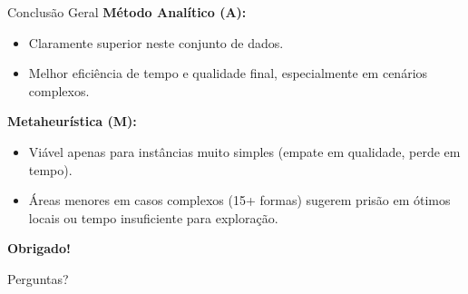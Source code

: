 \documentclass{beamer}
\begin{document}
\begin{frame}{Conclusão Geral}
    \textbf{Método Analítico (A):}
    \begin{itemize}
        \item Claramente superior neste conjunto de dados.
        \item Melhor eficiência de tempo e qualidade final, especialmente em cenários complexos.
    \end{itemize}

    \vspace{0.5cm}
    \textbf{Metaheurística (M):}
    \begin{itemize}
        \item Viável apenas para instâncias muito simples (empate em qualidade, perde em tempo).
        \item Áreas menores em casos complexos (15+ formas) sugerem prisão em ótimos locais ou tempo insuficiente para exploração.
    \end{itemize}
\end{frame}

\begin{frame}
    \centering
    \Huge \textbf{Obrigado!}
    
    \vspace{1cm}
    \large Perguntas?
\end{frame}
\end{document}
